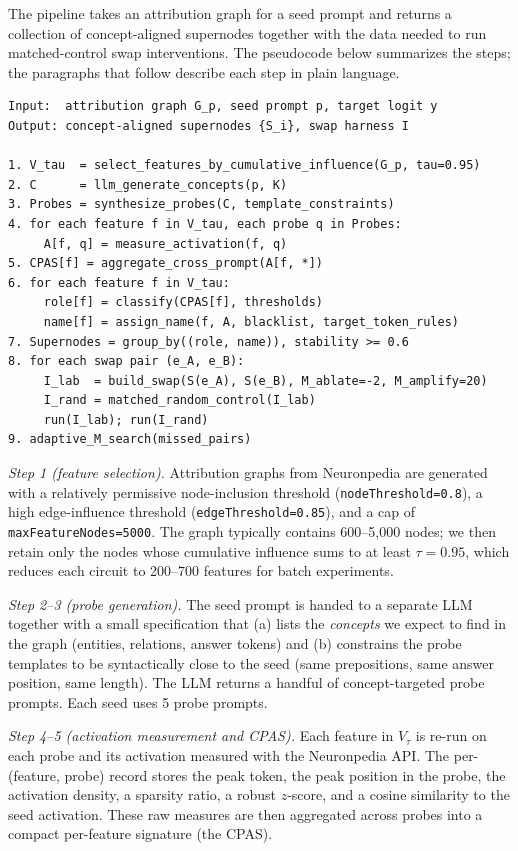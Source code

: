The pipeline takes an attribution graph for a seed prompt and returns a collection of concept-aligned supernodes together with the data needed to run matched-control swap interventions. The pseudocode below summarizes the steps; the paragraphs that follow describe each step in plain language.

\begin{small}
\begin{verbatim}
Input:  attribution graph G_p, seed prompt p, target logit y
Output: concept-aligned supernodes {S_i}, swap harness I

1. V_tau  = select_features_by_cumulative_influence(G_p, tau=0.95)
2. C      = llm_generate_concepts(p, K)
3. Probes = synthesize_probes(C, template_constraints)
4. for each feature f in V_tau, each probe q in Probes:
     A[f, q] = measure_activation(f, q)
5. CPAS[f] = aggregate_cross_prompt(A[f, *])
6. for each feature f in V_tau:
     role[f] = classify(CPAS[f], thresholds)
     name[f] = assign_name(f, A, blacklist, target_token_rules)
7. Supernodes = group_by((role, name)), stability >= 0.6
8. for each swap pair (e_A, e_B):
     I_lab  = build_swap(S(e_A), S(e_B), M_ablate=-2, M_amplify=20)
     I_rand = matched_random_control(I_lab)
     run(I_lab); run(I_rand)
9. adaptive_M_search(missed_pairs)
\end{verbatim}
\end{small}

\emph{Step 1 (feature selection).} Attribution graphs from Neuronpedia are generated with a relatively permissive node-inclusion threshold (\texttt{nodeThreshold=0.8}), a high edge-influence threshold (\texttt{edgeThreshold=0.85}), and a cap of \texttt{maxFeatureNodes=5000}. The graph typically contains 600--5{,}000 nodes; we then retain only the nodes whose cumulative influence sums to at least $\tau{=}0.95$, which reduces each circuit to 200--700 features for batch experiments.

\emph{Step 2--3 (probe generation).} The seed prompt is handed to a separate LLM together with a small specification that (a) lists the \emph{concepts} we expect to find in the graph (entities, relations, answer tokens) and (b) constrains the probe templates to be syntactically close to the seed (same prepositions, same answer position, same length). The LLM returns a handful of concept-targeted probe prompts. Each seed uses 5 probe prompts.

\emph{Step 4--5 (activation measurement and CPAS).} Each feature in $V_\tau$ is re-run on each probe and its activation measured with the Neuronpedia API. The per-(feature, probe) record stores the peak token, the peak position in the probe, the activation density, a sparsity ratio, a robust $z$-score, and a cosine similarity to the seed activation. These raw measures are then aggregated across probes into a compact per-feature signature (the CPAS).

